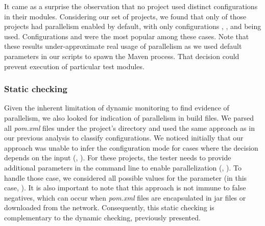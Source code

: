 It came as a surprise the observation that
no project used distinct configurations in their modules. Considering
our set of \numMedLong{} projects, we found that only
\textbf{\numProjectsPar{}} of those projects had parallelism enabled
by default, with only configurations \ParClassSeqMeth{},
\ParClassParMeth{}, and \ForkSeq{} being used.  Configurations
\ParClassParMeth{} and \ForkSeq{} were the most popular among these
cases.  Note that these results under-approximate real usage of
parallelism as we used default parameters in our scripts to spawn the
Maven process.  That decision could prevent execution of particular
test modules.


\subsubsection{Static checking}
\label{sec:rqC-2}
Given the inherent limitation of dynamic monitoring to find evidence
of parallelism, we also looked for indication of parallelism in build
files.  We
parsed all \emph{pom.xml} files under the project's directory and used
the same approach as in our previous analysis to classify
configurations.  We noticed initially that our approach was unable to
infer the configuration mode for cases where the decision depends on
the input (\eg,
). For these
projects, the tester needs to provide additional parameters in the
command line to enable parallelization (\eg, ). To handle those case, we
considered all possible values for the parameter (in this case,
).  It is also important to note that this
approach is not immune to false negatives, which can occur when
\emph{pom.xml} files are encapsulated in jar files or downloaded from
the network.  Consequently, this static checking is complementary to
the dynamic checking, previously presented.

